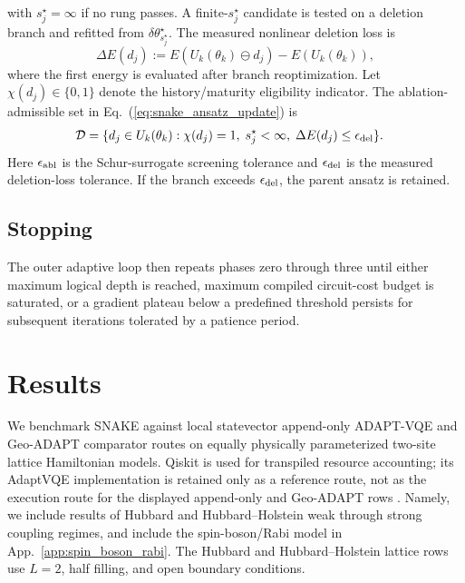 \documentclass[
  reprint,
  amsmath,
  amssymb,
  aps,
  pra,
  nofootinbib,
  superscriptaddress,
  floatfix
]{revtex4-2}
\begin{document}
with \(s_j^\star=\infty\) if no rung passes. A finite-\(s_j^\star\) candidate is tested on a deletion branch and refitted from \(\delta\theta_{s_j^\star}^\star\). The measured nonlinear deletion loss is
\begin{equation}
\Delta E(d_j)
:=
E(U_k(\theta_k)\ominus d_j)-E(U_k(\theta_k)),
\label{eq:ablation_refit_loss}
\end{equation}
where the first energy is evaluated after branch reoptimization. Let \(\chi(d_j)\in\{0,1\}\) denote the history/maturity eligibility indicator. The ablation-admissible set in Eq.~(\ref{eq:snake_ansatz_update}) is
\begin{equation}
\begin{aligned}
\mathcal D
=
\{d_j\in U_k(\theta_k):\;&
\chi(d_j)=1,\;
s_j^\star<\infty,\;
\Delta E(d_j)\le\epsilon_{\rm del}\}.
\end{aligned}
\label{eq:ablation_admissible_set}
\end{equation}
Here \(\epsilon_{\rm abl}\) is the Schur-surrogate screening tolerance and \(\epsilon_{\rm del}\) is the measured deletion-loss tolerance. If the branch exceeds \(\epsilon_{\rm del}\), the parent ansatz is retained.

\subsection{Stopping}
The outer adaptive loop then repeats phases zero through three until either maximum logical depth is reached, maximum compiled circuit-cost budget is saturated, or a gradient plateau below a predefined threshold persists for subsequent iterations tolerated by a patience period.


\section{Results}
\label{sec:results}
\label{sec:benchmarks}

We benchmark SNAKE against local statevector append-only ADAPT-VQE and Geo-ADAPT comparator routes on equally physically parameterized two-site lattice Hamiltonian models. Qiskit is used for transpiled resource accounting; its AdaptVQE implementation is retained only as a reference route, not as the execution route for the displayed append-only and Geo-ADAPT rows \cite{JavadiAbhari2024Qiskit,QiskitAlgorithmsAdaptVQE}. Namely, we include results of Hubbard and Hubbard--Holstein weak through strong coupling regimes, and include the spin-boson/Rabi model in App.~\ref{app:spin_boson_rabi}. The Hubbard and Hubbard--Holstein lattice rows use \(L=2\), half filling, and open boundary conditions.
\end{document}
